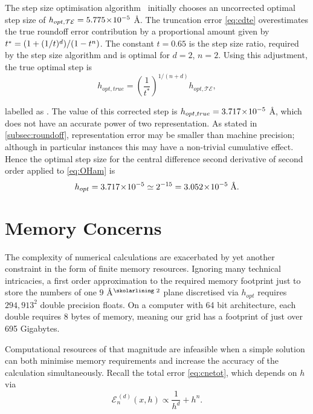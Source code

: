The step size optimisation algorithm~\cite{Mathur2012} initially chooses an uncorrected optimal step size  of $h_{opt,\mathcal{TE}} = 5.775\!\times\!10^{-5}$ Å.
The truncation error \cref{eq:cdte} overestimates the true roundoff error contribution by a proportional amount given by $\cramped{t^* = (1+(1/t)^d)/(1-t^n)}$.
The constant $t = 0.65$ is the step size ratio, required by the step size algorithm and is optimal for $d=2$, $n=2$.
Using this adjustment, the true optimal step is
\begin{equation}
h_{opt,true} = \left(\frac{1}{t^*}\right)^{1/(n+d)}h_{opt,\mathcal{TE}},\label{eq:hoptt}
\end{equation}

labelled as .
The value of this corrected step is $h_{opt,true} = 3.717\!\times\!10^{-5}$ Å, which does not have an accurate power of two representation.
As stated in \cref{subsec:roundoff}, representation error may be smaller than machine precision; although in particular instances this may have a non-trivial cumulative effect.
Hence the optimal step size for the central difference second derivative of second order applied to \cref{eq:OHam} is
\begin{equation}
h_{opt} = 3.717\!\times\!10^{-5} \simeq 2^{-15} = 3.052\!\times\!10^{-5}\;\text{Å}.
\end{equation}

\section{Memory Concerns}\label{sec:memcons}

The complexity of numerical calculations are exacerbated by yet another constraint in the form of finite memory resources.
Ignoring many technical intricacies, a first order approximation to the required memory footprint just to store the numbers of one $9$ Å$^\text{\skolarlining 2}$ plane discretised via $h_{opt}$ requires $294,913^2$ double precision floats.
On a computer with 64 bit architecture, each double requires 8 bytes of memory, meaning our grid has a footprint of just over 695 Gigabytes.

Computational resources of that magnitude are infeasible when a simple solution can both minimise memory requirements and increase the accuracy of the calculation simultaneously.
Recall the total error \cref{eq:cnetot}, which depends on $h$ via
\begin{equation}
\mathcal{E}_n^{\,(d)}(x,h) \propto \frac{1}{h^d} + h^n.
\end{equation}

